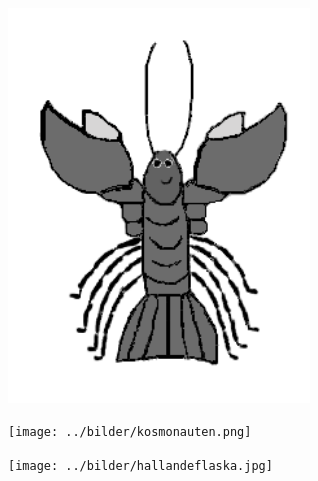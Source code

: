 



\begin{intersong}
	\begin{center}
		\includegraphics[width=0.6\textwidth]{../bilder/fardigabilder/CamillasFardigaBilder/Krafta.png} 
	\end{center}
\end{intersong}
\sclearpage

\sclearpage




%
\sclearpage


\sclearpage


\sclearpage

\sclearpage

\begin{intersong}
\begin{center}
\texttt{[image: ../bilder/kosmonauten.png]} 
\end{center}
\vspace{10mm}
\end{intersong}

\sclearpage
\sclearpage


\sclearpage

\sclearpage

\begin{intersong}
\begin{center}
\texttt{[image: ../bilder/hallandeflaska.jpg]} 
\end{center}
\end{intersong}
\sclearpage



